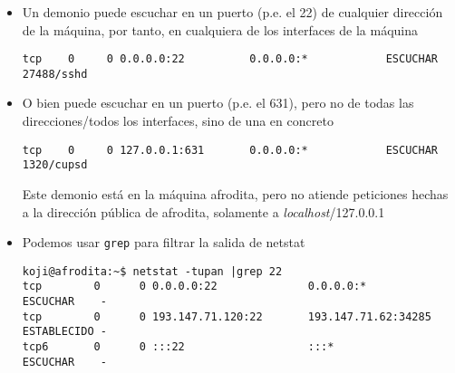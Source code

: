 \documentclass[ucs]{beamer}
\begin{document}
\begin{frame}[fragile]
\frametitle{}

\begin{itemize}
\item
Un demonio puede escuchar en un puerto (p.e. el 22) de cualquier
dirección de la máquina, por tanto, en cualquiera de los interfaces de la máquina
  \begin{tiny}
  \begin{verbatim}
tcp    0     0 0.0.0.0:22          0.0.0.0:*            ESCUCHAR    27488/sshd      
  \end{verbatim}
  \end{tiny}
\item
O bien puede escuchar en un puerto (p.e. el 631), pero no de todas 
las direcciones/todos los interfaces, sino de una en concreto
  \begin{tiny}
  \begin{verbatim}
tcp    0     0 127.0.0.1:631       0.0.0.0:*            ESCUCHAR    1320/cupsd      
  \end{verbatim}
  \end{tiny}
Este demonio está en la máquina afrodita, pero no atiende peticiones hechas a la
dirección pública de afrodita, solamente a \emph{localhost}/127.0.0.1
\item
Podemos usar \verb|grep| para filtrar la salida de netstat
  \begin{tiny}
  \begin{verbatim}
koji@afrodita:~$ netstat -tupan |grep 22
tcp        0      0 0.0.0.0:22              0.0.0.0:*               ESCUCHAR    -               
tcp        0      0 193.147.71.120:22       193.147.71.62:34285     ESTABLECIDO -               
tcp6       0      0 :::22                   :::*                    ESCUCHAR    -      
  \end{verbatim}
  \end{tiny}

\end{itemize}

\end{frame}
\end{document}
